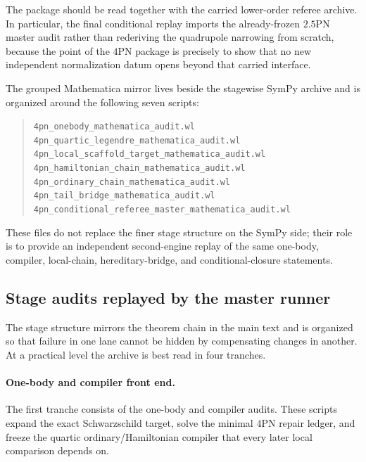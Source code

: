 \documentclass[11pt]{article}
\begin{document}
The package should be read together with the carried lower-order referee archive.
In particular, the final conditional replay imports the already-frozen $2.5$PN
master audit rather than rederiving the quadrupole narrowing from scratch,
because the point of the $4$PN package is precisely to show that no new
independent normalization datum opens beyond that carried interface.

The grouped Mathematica mirror lives beside the stagewise SymPy archive and is
organized around the following seven scripts:
\begin{quote}
\raggedright
\small
\nolinkurl{4pn_onebody_mathematica_audit.wl}\\
\nolinkurl{4pn_quartic_legendre_mathematica_audit.wl}\\
\nolinkurl{4pn_local_scaffold_target_mathematica_audit.wl}\\
\nolinkurl{4pn_hamiltonian_chain_mathematica_audit.wl}\\
\nolinkurl{4pn_ordinary_chain_mathematica_audit.wl}\\
\nolinkurl{4pn_tail_bridge_mathematica_audit.wl}\\
\nolinkurl{4pn_conditional_referee_master_mathematica_audit.wl}
\end{quote}
These files do not replace the finer stage structure on the SymPy side; their
role is to provide an independent second-engine replay of the same one-body,
compiler, local-chain, hereditary-bridge, and conditional-closure statements.

\subsection{Stage audits replayed by the master runner}
\label{sec:verification-stage-audits}

The stage structure mirrors the theorem chain in the main text and is organized
so that failure in one lane cannot be hidden by compensating changes in another.
At a practical level the archive is best read in four tranches.

\paragraph{One-body and compiler front end.}
The first tranche consists of the one-body and compiler audits.  These scripts
expand the exact Schwarzschild target, solve the minimal $4$PN repair ledger,
and freeze the quartic ordinary/Hamiltonian compiler that every later local
comparison depends on.
\end{document}
